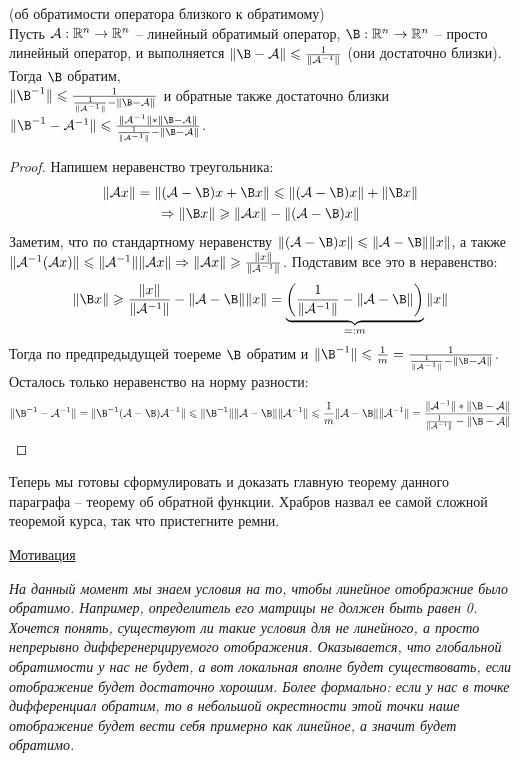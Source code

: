 \begin{theorem} (об обратимости оператора близкого к обратимому) \\
    Пусть $\mathcal{A}: \mathbb{R}^n \to \mathbb{R}^n$ -- линейный обратимый оператор, $\B: \R^n \to \R^n$ -- просто линейный оператор, и выполняется $\| \B - \A \| \leqslant \frac{1}{\| \A^{-1} \|}$ (они достаточно близки).
    Тогда $\B$ обратим, \\ $\| \B^{-1} \| \leqslant \frac{1}{\frac{1}{\| \A^{-1} \|} - \| \B - \A \|}$ и обратные также достаточно близки $\| \B^{-1} - \A^{-1} \| \leqslant \frac{\| \A^{-1} \| * \| \B - \A \|}{\frac{1}{\| \A^{-1} \|} - \| \B - \A \|}$.
\end{theorem}
\begin{proof}
    Напишем неравенство треугольника: \begin{gather*}
        \| \A x \| = \| (\A - \B)x + \B x \| \leqslant \| (\A - \B)x \| + \| \B x \| \\
        \Rightarrow \| \B x \| \geqslant \| \A x \| - \| (\A - \B)x \|
    \end{gather*}
    \quad Заметим, что по стандартному неравенству $\| (\A - \B)x \| \leqslant \| \A - \B \| \| x \|$, а также $\| \mathcal{A}^{-1}(\mathcal{A} x) \| \leqslant \| \mathcal{A}^{-1} \| \| \mathcal{A} x \| \Rightarrow \| \mathcal{A} x \| \geqslant \frac{\| x \|}{\| \mathcal{A}^{-1} \| }$. 
    Подставим все это в неравенство: \begin{gather*}
        \| \B x \| \geqslant  \frac{\| x \|}{\| \A^{-1} \|} - \| \A - \B \| \| x \| = \underbrace{\left(\frac{1}{\| \A^{-1} \|} - \| \A - \B \| \right)}_{=: m} \| x \|
    \end{gather*}
    \quad Тогда по предпредыдущей тоереме $\B$ обратим и $\| \B^{-1} \| \leqslant \frac{1}{m} = \frac{1}{\frac{1}{\| \A^{-1} \|} - \| \B - \A \|}$. 
    Осталось только неравенство на норму разности: \[ \| \B^{-1} - \A^{-1} \| = \| \B^{-1}(\A - \B)\A^{-1} \| \leqslant \| \B^{-1}\| \| \A - \B \| \| \A^{-1} \| \leqslant \frac{1}{m}\| \A - \B \| \| \A^{-1} \| = \frac{\| \A^{-1} \| * \| \B - \A \|}{\frac{1}{\| \A^{-1} \|} - \| \B - \A \|}  \] 
\end{proof}

Теперь мы готовы сформулировать и доказать главную теорему данного параграфа -- теорему об обратной функции.
Храбров назвал ее самой сложной теоремой курса, так что пристегните ремни.

\underline{Мотивация}

\quad \textit{На данный момент мы знаем условия на то, чтобы линейное отображние было обратимо.
Например, определитель его матрицы не должен быть равен 0. 
Хочется понять, существуют ли такие условия для не линейного, а просто непрерывно дифференерцируемого отображения.
Оказывается, что глобальной обратимости у нас не будет, а вот локальная вполне будет существовать, если отображение будет достаточно хорошим.
Более формально: если у нас в точке дифференциал обратим, то в небольшой окрестности этой точки наше отображение будет вести себя примерно как линейное, а значит будет обратимо.}

